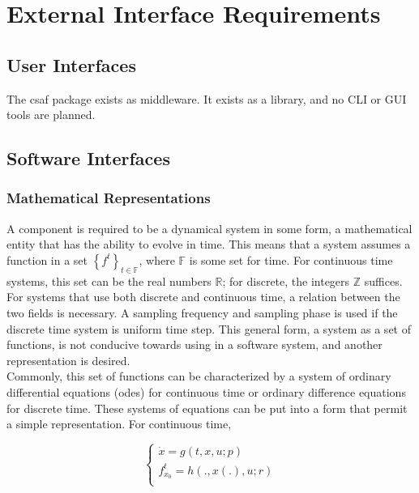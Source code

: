 \chapter{External Interface Requirements}

\section{User Interfaces}

The \acrshort{csaf}  package exists as middleware. It exists as a library, and no CLI or GUI tools are planned.

\section{Software Interfaces}

\subsection{Mathematical Representations}
A component is required to be a dynamical system in some form, a mathematical entity that has the ability to 
evolve in time. This means that a system assumes a function in a set $\left\{ f^t \right\}_{t \in \mathbb F}$, 
where $\mathbb F$ is some set for time. For continuous time systems, this set can be the real numbers $
\mathbb R$; for discrete, the integers $\mathbb Z$ suffices. For systems that use both discrete and 
continuous time, a relation between the two fields is necessary. A sampling frequency and sampling phase is 
used if the discrete time system is uniform time step. This general form, a system as a set of functions, is not 
conducive towards using in a software system, and another representation is desired. \\


Commonly, this set of functions can be characterized by a system of ordinary differential equations 
(\acrshort{ode}s) for continuous time or ordinary difference equations for discrete time. These systems of 
equations can be put into a form that permit a simple representation. For continuous time,

\begin{equation}
\begin{cases}
\dot x = g(t, x, u; p) \\
f_{x_0}^t = h(., x(.), u; r) \\
\end{cases}
\end{equation}

